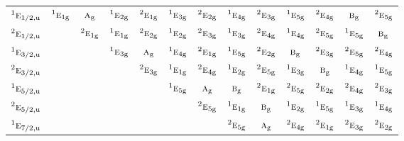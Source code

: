 \documentclass[10pt,a4paper]{article}
\numberwithin{equation}{section}
\newcommand{\irr}[1]{\text{\normalfont\scshape #1}}
\newcommand{\conjpair}[1]{{}^{#1}}
\newcommand{\ptag}[1]{\mathrm{#1}}
\begin{document}
{\begin{longtable}{@{}lcccccccccccc@{}}
$\conjpair{1}\irr{e}_{1/2,\ptag{u}}$ & $\conjpair{1}\irr{e}_{1\ptag{g}}$ & $\irr{a}_{\ptag{g}}$ & $\conjpair{1}\irr{e}_{2\ptag{g}}$ & $\conjpair{2}\irr{e}_{1\ptag{g}}$ & $\conjpair{1}\irr{e}_{3\ptag{g}}$ & $\conjpair{2}\irr{e}_{2\ptag{g}}$ & $\conjpair{1}\irr{e}_{4\ptag{g}}$ & $\conjpair{2}\irr{e}_{3\ptag{g}}$ & $\conjpair{1}\irr{e}_{5\ptag{g}}$ & $\conjpair{2}\irr{e}_{4\ptag{g}}$ & $\irr{b}_{\ptag{g}}$ & $\conjpair{2}\irr{e}_{5\ptag{g}}$\\
$\conjpair{2}\irr{e}_{1/2,\ptag{u}}$ &  & $\conjpair{2}\irr{e}_{1\ptag{g}}$ & $\conjpair{1}\irr{e}_{1\ptag{g}}$ & $\conjpair{2}\irr{e}_{2\ptag{g}}$ & $\conjpair{1}\irr{e}_{2\ptag{g}}$ & $\conjpair{2}\irr{e}_{3\ptag{g}}$ & $\conjpair{1}\irr{e}_{3\ptag{g}}$ & $\conjpair{2}\irr{e}_{4\ptag{g}}$ & $\conjpair{1}\irr{e}_{4\ptag{g}}$ & $\conjpair{2}\irr{e}_{5\ptag{g}}$ & $\conjpair{1}\irr{e}_{5\ptag{g}}$ & $\irr{b}_{\ptag{g}}$\\
$\conjpair{1}\irr{e}_{3/2,\ptag{u}}$ &  &  & $\conjpair{1}\irr{e}_{3\ptag{g}}$ & $\irr{a}_{\ptag{g}}$ & $\conjpair{1}\irr{e}_{4\ptag{g}}$ & $\conjpair{2}\irr{e}_{1\ptag{g}}$ & $\conjpair{1}\irr{e}_{5\ptag{g}}$ & $\conjpair{2}\irr{e}_{2\ptag{g}}$ & $\irr{b}_{\ptag{g}}$ & $\conjpair{2}\irr{e}_{3\ptag{g}}$ & $\conjpair{2}\irr{e}_{5\ptag{g}}$ & $\conjpair{2}\irr{e}_{4\ptag{g}}$\\
$\conjpair{2}\irr{e}_{3/2,\ptag{u}}$ &  &  &  & $\conjpair{2}\irr{e}_{3\ptag{g}}$ & $\conjpair{1}\irr{e}_{1\ptag{g}}$ & $\conjpair{2}\irr{e}_{4\ptag{g}}$ & $\conjpair{1}\irr{e}_{2\ptag{g}}$ & $\conjpair{2}\irr{e}_{5\ptag{g}}$ & $\conjpair{1}\irr{e}_{3\ptag{g}}$ & $\irr{b}_{\ptag{g}}$ & $\conjpair{1}\irr{e}_{4\ptag{g}}$ & $\conjpair{1}\irr{e}_{5\ptag{g}}$\\
$\conjpair{1}\irr{e}_{5/2,\ptag{u}}$ &  &  &  &  & $\conjpair{1}\irr{e}_{5\ptag{g}}$ & $\irr{a}_{\ptag{g}}$ & $\irr{b}_{\ptag{g}}$ & $\conjpair{2}\irr{e}_{1\ptag{g}}$ & $\conjpair{2}\irr{e}_{5\ptag{g}}$ & $\conjpair{2}\irr{e}_{2\ptag{g}}$ & $\conjpair{2}\irr{e}_{4\ptag{g}}$ & $\conjpair{2}\irr{e}_{3\ptag{g}}$\\
$\conjpair{2}\irr{e}_{5/2,\ptag{u}}$ &  &  &  &  &  & $\conjpair{2}\irr{e}_{5\ptag{g}}$ & $\conjpair{1}\irr{e}_{1\ptag{g}}$ & $\irr{b}_{\ptag{g}}$ & $\conjpair{1}\irr{e}_{2\ptag{g}}$ & $\conjpair{1}\irr{e}_{5\ptag{g}}$ & $\conjpair{1}\irr{e}_{3\ptag{g}}$ & $\conjpair{1}\irr{e}_{4\ptag{g}}$\\
$\conjpair{1}\irr{e}_{7/2,\ptag{u}}$ &  &  &  &  &  &  & $\conjpair{2}\irr{e}_{5\ptag{g}}$ & $\irr{a}_{\ptag{g}}$ & $\conjpair{2}\irr{e}_{4\ptag{g}}$ & $\conjpair{2}\irr{e}_{1\ptag{g}}$ & $\conjpair{2}\irr{e}_{3\ptag{g}}$ & $\conjpair{2}\irr{e}_{2\ptag{g}}$\\

\end{longtable}}
\end{document}
